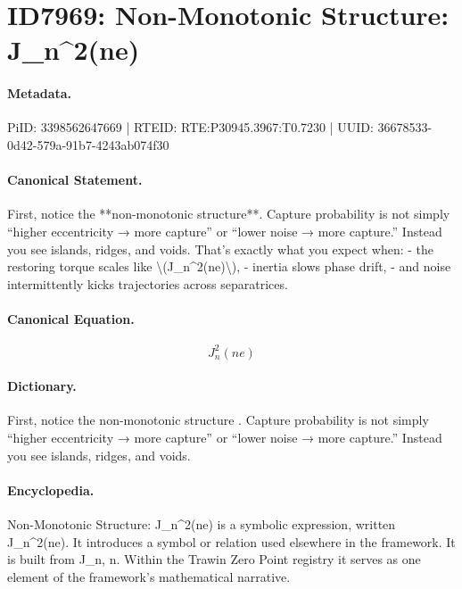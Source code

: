 \section*{ID7969: Non-Monotonic Structure: J\_n\textasciicircum{}2(ne)}
\paragraph{Metadata.}
PiID: 3398562647669 | RTEID: RTE:P30945.3967:T0.7230 | UUID: 36678533-0d42-579a-91b7-4243ab074f30

\paragraph{Canonical Statement.}
First, notice the **non-monotonic structure**. Capture probability is not simply “higher eccentricity → more capture” or “lower noise → more capture.” Instead you see islands, ridges, and voids. That’s exactly what you expect when: - the restoring torque scales like \textbackslash{}(J\_n\textasciicircum{}2(ne)\textbackslash{}), - inertia slows phase drift, - and noise intermittently kicks trajectories across separatrices.

\paragraph{Canonical Equation.}
\[
J_n^2(ne)
\]

\paragraph{Dictionary.}
First, notice the non-monotonic structure . Capture probability is not simply “higher eccentricity → more capture” or “lower noise → more capture.” Instead you see islands, ridges, and voids.

\paragraph{Encyclopedia.}
Non-Monotonic Structure: J\_n\textasciicircum{}2(ne) is a symbolic expression, written J\_n\textasciicircum{}2(ne). It introduces a symbol or relation used elsewhere in the framework. It is built from J\_n, n. Within the Trawin Zero Point registry it serves as one element of the framework's mathematical narrative.
